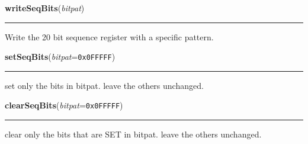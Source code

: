     \label{dsp:writeSeqBits}

    \vspace{0.5ex}

    \begin{boxedminipage}{\textwidth}

    \raggedright \textbf{writeSeqBits}(\textit{bitpat})

    \vspace{-1.5ex}

    \rule{\textwidth}{0.5\fboxrule}
    Write the 20 bit sequence register with a specific pattern.

    \vspace{1ex}

    \end{boxedminipage}

    \label{dsp:setSeqBits}

    \vspace{0.5ex}

    \begin{boxedminipage}{\textwidth}

    \raggedright \textbf{setSeqBits}(\textit{bitpat}=\texttt{0x0FFFFF})

    \vspace{-1.5ex}

    \rule{\textwidth}{0.5\fboxrule}
    set only the bits in bitpat. leave the others unchanged.

    \vspace{1ex}

    \end{boxedminipage}

    \label{dsp:clearSeqBits}

    \vspace{0.5ex}

    \begin{boxedminipage}{\textwidth}

    \raggedright \textbf{clearSeqBits}(\textit{bitpat}=\texttt{0x0FFFFF})

    \vspace{-1.5ex}

    \rule{\textwidth}{0.5\fboxrule}
    clear only the bits that are SET in bitpat. leave the others unchanged.

    \vspace{1ex}

    \end{boxedminipage}

